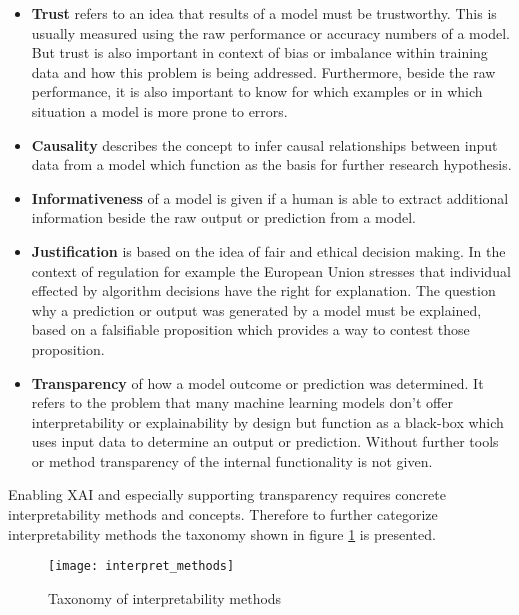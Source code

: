 \documentclass[../main.tex]{subfiles}
\begin{document}
\begin{itemize}
    \item \textbf{Trust} refers to an idea that results of a model must be trustworthy. This is usually measured using the raw performance or accuracy numbers of a model. But trust is also important in context of bias or imbalance within training data and how this problem is being addressed. Furthermore, beside the raw performance, it is also important to know for which examples or in which situation a model is more prone to errors. 

    \item \textbf{Causality} describes the concept to infer causal relationships between input data from a model which function as the basis for further research hypothesis. 

    \item \textbf{Informativeness} of a model is given if a human is able to extract additional information beside the raw output or prediction from a model.

    \item \textbf{Justification} is based on the idea of fair and ethical decision making. In the context of regulation for example the European Union stresses that individual effected by algorithm decisions have the right for explanation. The question why a prediction or output was generated by a model must be explained, based on a falsifiable proposition which provides a way to contest those proposition. 

    \item \textbf{Transparency} of how a model outcome or prediction was determined. It refers to the problem that many machine learning models don't offer interpretability or explainability by design but function as a black-box which uses input data to determine an output or prediction. Without further tools or method transparency of the internal functionality is not given.

\end{itemize}

Enabling XAI and especially supporting transparency requires concrete interpretability methods and concepts.  Therefore to further categorize interpretability methods the taxonomy shown in figure \ref{fig:interpret_methods} is presented.

\begin{figure}[H]
    \centering
    \texttt{[image: interpret\_methods]}    
    \caption{Taxonomy of interpretability methods \cite{linardatos_explainable_2021}}
    \label{fig:interpret_methods}
\end{figure}
\end{document}
